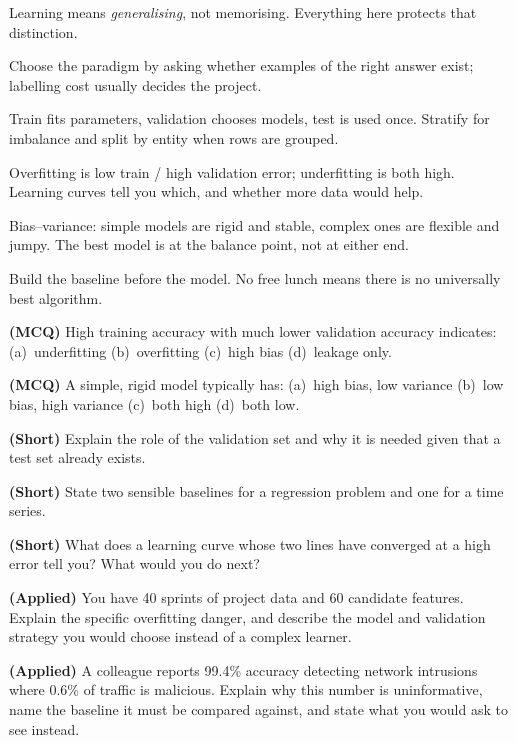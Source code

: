 \begin{chaptersummary}
\begin{tight}
  \item Learning means \emph{generalising}, not memorising. Everything here
        protects that distinction.
  \item Choose the paradigm by asking whether examples of the right answer exist;
        labelling cost usually decides the project.
  \item Train fits parameters, validation chooses models, test is used once.
        Stratify for imbalance and split by entity when rows are grouped.
  \item Overfitting is low train / high validation error; underfitting is both
        high. Learning curves tell you which, and whether more data would help.
  \item Bias--variance: simple models are rigid and stable, complex ones are
        flexible and jumpy. The best model is at the balance point, not at either
        end.
  \item Build the baseline before the model. No free lunch means there is no
        universally best algorithm.
\end{tight}
\end{chaptersummary}

\begin{reviewq}
  \item \textbf{(MCQ)} High training accuracy with much lower validation accuracy
        indicates: (a)~underfitting (b)~overfitting (c)~high bias (d)~leakage only.
  \item \textbf{(MCQ)} A simple, rigid model typically has: (a)~high bias, low
        variance (b)~low bias, high variance (c)~both high (d)~both low.
  \item \textbf{(Short)} Explain the role of the validation set and why it is
        needed given that a test set already exists.
  \item \textbf{(Short)} State two sensible baselines for a regression problem and
        one for a time series.
  \item \textbf{(Short)} What does a learning curve whose two lines have converged
        at a high error tell you? What would you do next?
  \item \textbf{(Applied)} You have 40 sprints of project data and 60 candidate
        features. Explain the specific overfitting danger, and describe the model
        and validation strategy you would choose instead of a complex learner.
  \item \textbf{(Applied)} A colleague reports 99.4\% accuracy detecting network
        intrusions where 0.6\% of traffic is malicious. Explain why this number is
        uninformative, name the baseline it must be compared against, and state
        what you would ask to see instead.
\end{reviewq}

